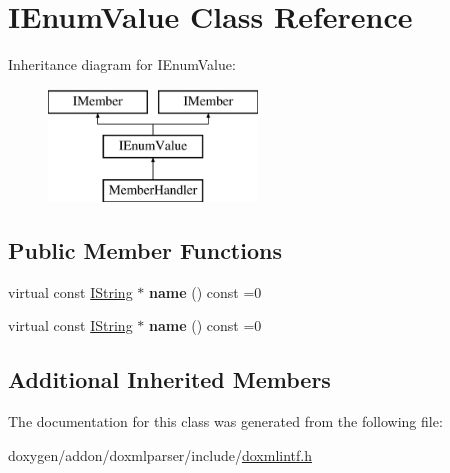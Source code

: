 \hypertarget{class_i_enum_value}{}\section{I\+Enum\+Value Class Reference}
\label{class_i_enum_value}
Inheritance diagram for I\+Enum\+Value\+:\begin{figure}[H]
\begin{center}
\leavevmode
\includegraphics[height=3.000000cm]{class_i_enum_value}
\end{center}
\end{figure}
\subsection*{Public Member Functions}
\begin{DoxyCompactItemize}
\item 
\mbox{\label{class_i_enum_value_a060630c39f17edaaddd92857bbc12edd}} 
virtual const \mbox{\hyperlink{class_i_string}{I\+String}} $\ast$ {\bfseries name} () const =0
\item 
\mbox{\label{class_i_enum_value_a060630c39f17edaaddd92857bbc12edd}} 
virtual const \mbox{\hyperlink{class_i_string}{I\+String}} $\ast$ {\bfseries name} () const =0
\end{DoxyCompactItemize}
\subsection*{Additional Inherited Members}


The documentation for this class was generated from the following file\+:\begin{DoxyCompactItemize}
\item 
doxygen/addon/doxmlparser/include/\mbox{\hyperlink{include_2doxmlintf_8h}{doxmlintf.\+h}}\end{DoxyCompactItemize}
